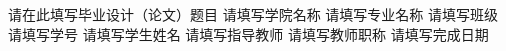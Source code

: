 \documentclass{zustcs-thesis}
\newcommand{\bindingblankpage}{\clearpage\thispagestyle{empty}\null\clearpage}
\begin{document}
\makethesiscover
  {请在此填写毕业设计（论文）题目}
  {请填写学院名称}
  {请填写专业名称}
  {请填写班级}
  {请填写学号}
  {请填写学生姓名}
  {请填写指导教师}
  {请填写教师职称}
  {请填写完成日期}

\bindingblankpage

\makeauthorizationpage
\makecopyrightpage

\frontmatter
{}




\thesistableofcontents

\mainmatter




\bindingblankpage
\end{document}
